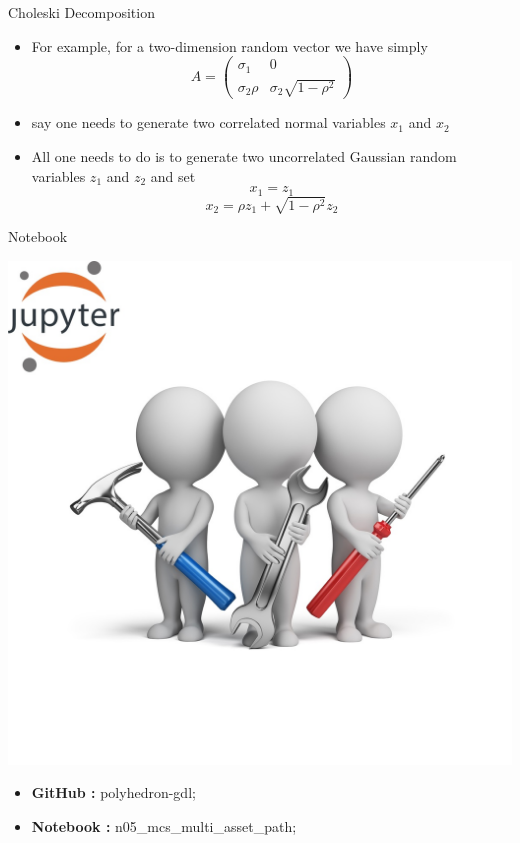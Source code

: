 \documentclass[11pt]{beamer}
\begin{document}
\begin{frame}{Choleski Decomposition}
\begin{itemize}
\item For example, for a two-dimension random vector we have simply
$$
A=
\begin{pmatrix} 
\sigma_1        & 0   \\ 
\sigma_2 \rho & \sigma_2 \sqrt{1-\rho^2}   
\end{pmatrix}
$$
\item say one needs to generate two correlated normal variables $x_1$ and $x_2$
\item All one needs to do is to generate two uncorrelated Gaussian random variables $z_1$ and $ z_2$ and set
$$
x_1 = z_1 
$$
$$
x_2 =  \rho z_1 + \sqrt{1-\rho^2} z_2
$$
\end{itemize}
\end{frame}
\begin{frame}{Notebook}
\noindent\begin{minipage}{0.5\textwidth}%
\includegraphics[width=\linewidth]{img/exercise.jpg}
\end{minipage}%
\hfill%
\begin{minipage}{0.5\textwidth}
\begin{itemize}
\item {\bf GitHub        : }    polyhedron-gdl;
\item {\bf Notebook      : }    n05\_mcs\_multi\_asset\_path;
\end{itemize}
\end{minipage}
\end{frame}
\end{document}
